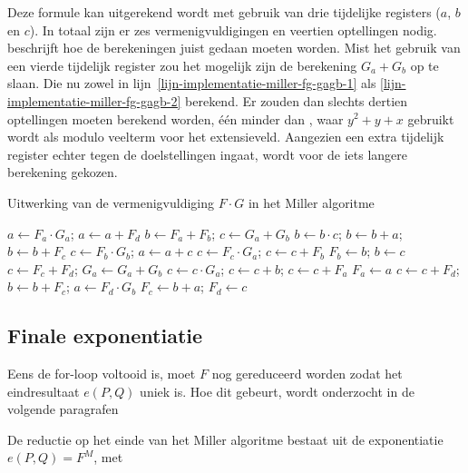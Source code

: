 Deze formule kan uitgerekend wordt met gebruik van drie tijdelijke registers ($a$, $b$ en $c$). In totaal zijn er zes vermenigvuldigingen en veertien optellingen nodig.  beschrijft hoe de berekeningen juist gedaan moeten worden. Mist het gebruik van een vierde tijdelijk register zou het mogelijk zijn de berekening $G_a + G_b$ op te slaan. Die nu zowel in lijn~\ref{lijn-implementatie-miller-fg-gagb-1} als \ref{lijn-implementatie-miller-fg-gagb-2} berekend. Er zouden dan slechts dertien optellingen moeten berekend worden, \'e\'en minder dan \cite{beuchat}, waar $y^2 + y +x$ gebruikt wordt als modulo veelterm voor het extensieveld. Aangezien een extra tijdelijk register echter tegen de doelstellingen ingaat, wordt voor de iets langere berekening gekozen.

\begin{algorithm}[h]
	\caption{Uitwerking van de vermenigvuldiging $F \cdot G$ in het Miller algoritme}
	\label{algoritme-implementatie-miller-fg}
	$a \leftarrow F_a \cdot G_a$; $a \leftarrow a + F_d$\;
	$b \leftarrow F_a + F_b$; $c \leftarrow G_a + G_b$\;
	$b \leftarrow b \cdot c$; $b \leftarrow b + a$; $b \leftarrow b + F_c$\;
	$c \leftarrow F_b \cdot G_b$; $a \leftarrow a + c$\;
	$c \leftarrow F_c \cdot G_a$;	$c \leftarrow c + F_b$\;
	$F_b \leftarrow b$; $b \leftarrow c$\;
	$c \leftarrow F_c + F_d$; $G_a \leftarrow G_a + G_b$\;
	$c \leftarrow c \cdot G_a$; $c \leftarrow c + b$; $c \leftarrow c + F_a$\;
	$F_a \leftarrow a$\;
	$c \leftarrow c + F_d$; $b \leftarrow b + F_c$; $a \leftarrow F_d \cdot G_b$\;
	$F_c \leftarrow b + a$; $F_d \leftarrow c$\;
\end{algorithm}

\subsection{Finale exponentiatie}\label{subsectie-implementatie-miller-finale-exp}

Eens de for-loop voltooid is, moet $F$ nog gereduceerd worden zodat het eindresultaat $e(P, Q)$ uniek is. Hoe dit gebeurt, wordt onderzocht in de volgende paragrafen

De reductie op het einde van het Miller algoritme bestaat uit de exponentiatie $e(P, Q) = F^M$, met

